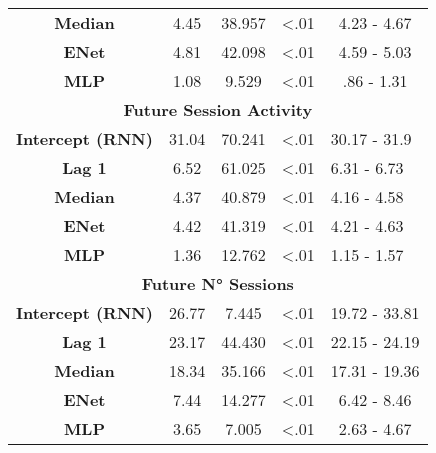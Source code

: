\begin{table}[h]
\begin{tabular}{ccccc}
\textbf{Median}          & 4.45                & 38.957     & \textless .01  & 4.23 - 4.67                     \\
\textbf{ENet}            & 4.81                & 42.098     & \textless .01  & 4.59 - 5.03                     \\
\textbf{MLP}             & 1.08                & 9.529      & \textless .01  & .86 - 1.31                     \\ \hline
\multicolumn{5}{c}{\textbf{Future Session Activity}}                                                                 \\ \hline
\textbf{Intercept (RNN)} & 31.04                & 70.241     & \textless .01  & \multicolumn{1}{l}{30.17 - 31.9} \\
\textbf{Lag 1}            & 6.52                & 61.025     & \textless .01  & \multicolumn{1}{l}{6.31 - 6.73} \\
\textbf{Median}          & 4.37                & 40.879     & \textless .01  & \multicolumn{1}{l}{4.16 - 4.58} \\
\textbf{ENet}            & 4.42                & 41.319     & \textless .01  & \multicolumn{1}{l}{4.21 - 4.63} \\
\textbf{MLP}             & 1.36                & 12.762     & \textless .01  & \multicolumn{1}{l}{1.15 - 1.57} \\ \hline
\multicolumn{5}{c}{\textbf{Future N° Sessions}}                                                                      \\ \hline
\textbf{Intercept (RNN)} & 26.77                & 7.445     & \textless .01  & 19.72 - 33.81                     \\
\textbf{Lag 1}            & 23.17                & 44.430     & \textless .01  & 22.15 - 24.19                     \\
\textbf{Median}          &  18.34              & 35.166     & \textless .01  & 17.31 - 19.36                     \\
\textbf{ENet}            & 7.44                & 14.277     & \textless .01  & 6.42 - 8.46                     \\
\textbf{MLP}             & 3.65                & 7.005      & \textless .01  & 2.63 - 4.67                       \\ \hline
\end{tabular}
\end{table}